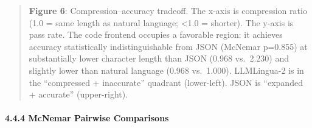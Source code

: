 \begin{quote}

\textbf{Figure 6}: Compression--accuracy tradeoff. The x-axis is compression ratio (1.0 = same length as natural language; \textless1.0 = shorter). The y-axis is pass rate. The code frontend occupies a favorable region: it achieves accuracy statistically indistinguishable from JSON (McNemar p=0.855) at substantially lower character length than JSON (0.968 vs.~2.230) and slightly lower than natural language (0.968 vs.~1.000). LLMLingua-2 is in the ``compressed + inaccurate'' quadrant (lower-left). JSON is ``expanded + accurate'' (upper-right).

\end{quote}



\paragraph{4.4.4 McNemar Pairwise Comparisons}\label{mcnemar-pairwise-comparisons}



